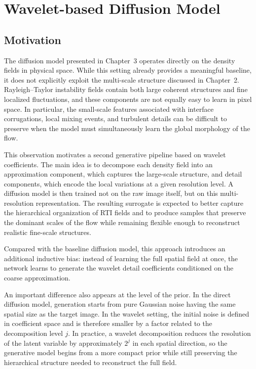 \chapter{Wavelet-based Diffusion Model}

\section{Motivation}

The diffusion model presented in Chapter~3 operates directly on the density
fields in physical space. While this setting already provides a meaningful
baseline, it does not explicitly exploit the multi-scale structure discussed in
Chapter~2. Rayleigh--Taylor instability fields contain both large coherent
structures and fine localized fluctuations, and these components are not
equally easy to learn in pixel space. In particular, the small-scale features
associated with interface corrugations, local mixing events, and turbulent
details can be difficult to preserve when the model must simultaneously learn
the global morphology of the flow.

This observation motivates a second generative pipeline based on wavelet
coefficients. The main idea is to decompose each density field into an
approximation component, which captures the large-scale structure, and detail
components, which encode the local variations at a given resolution level. A
diffusion model is then trained not on the raw image itself, but on this
multi-resolution representation. The resulting surrogate is expected to better
capture the hierarchical organization of RTI fields and to produce samples that
preserve the dominant scales of the flow while remaining flexible enough to
reconstruct realistic fine-scale structures.

Compared with the baseline diffusion model, this approach introduces an
additional inductive bias: instead of learning the full spatial field at once,
the network learns to generate the wavelet detail coefficients conditioned on
the coarse approximation. 

An important difference also appears at the level of the prior. In the direct
diffusion model, generation starts from pure Gaussian noise having the same
spatial size as the target image. In the wavelet setting, the initial noise is
defined in coefficient space and is therefore smaller by a factor related to
the decomposition level $j$. In practice, a wavelet decomposition reduces the
resolution of the latent variable by approximately $2^j$ in each spatial
direction, so the generative model begins from a more compact prior while
still preserving the hierarchical structure needed to reconstruct the full
field.

